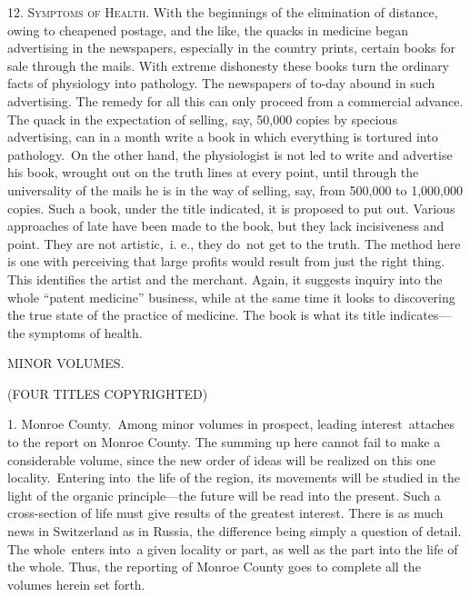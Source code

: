 \documentclass[twoside,symmetric,nobib,justified]{tufte-book}
\begin{document}
12. \textsc{Symptoms of Health}. With the beginnings of the elimination of
distance, owing to cheapened postage, and the like, the quacks in
medicine began advertising in the newspapers, especially in the country
prints, certain books for sale through the mails. With extreme
dishonesty these books turn the ordinary facts of physiology into
pathology. The newspapers of to-day abound in such advertising. The
remedy for all this can only proceed from a commercial advance. The
quack in the expectation of selling, say, 50,000 copies by specious
advertising, can in a month write a book in which everything is tortured
into pathology.~On the other hand, the physiologist is not led to write
and advertise his book, wrought out on the truth lines at every point,
until through the universality of the mails he is in the way of selling,
say, from 500,000 to 1,000,000 copies. Such a book, under the title
indicated, it is proposed to put out. Various approaches of late have
been made to the book, but they lack incisiveness and point. They are
not artistic,~i. e., they do~not get to the truth. The method here is
one with perceiving that large profits would result from just the right
thing. This identifies the artist and the merchant. Again, it suggests
inquiry into the whole ``patent medicine'' business, while at the same
time it looks to discovering the true state of the practice of medicine.
The book is what its title indicates---the symptoms of health.~

\newpage\begin{center}

\vspace{.15in}
    
\large{MINOR VOLUMES.}

\vspace{.05in}

\small{(FOUR TITLES COPYRIGHTED)}

\end{center}


1. Monroe County.~Among minor volumes in prospect, leading
  interest~attaches to the report on Monroe County. The summing up here
  cannot fail to make a considerable volume, since the new order of
  ideas will be realized on this one locality.~Entering into~the life of
  the region, its movements will be studied in the light of the organic
  principle---the future will be read into the present. Such a
  cross-section of life must give results of the greatest interest.
  There is as much news in Switzerland as in Russia, the difference
  being simply a question of detail. The whole~enters into~a given
  locality or part, as well as the part into the life of the whole.
  Thus, the reporting of Monroe County goes to complete all the volumes
  herein set forth.~
\end{document}
